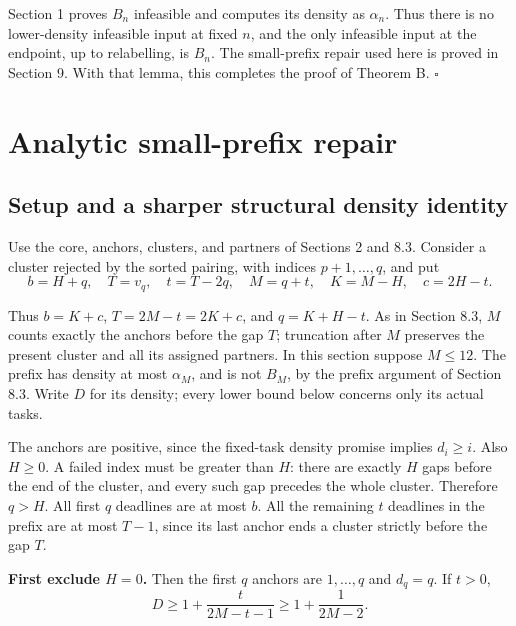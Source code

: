 \documentclass[11pt,a4paper]{article}
\begin{document}
Section 1 proves \(B_n\) infeasible and computes its density as \(\alpha_n\). Thus there is no lower-density infeasible input at fixed \(n\), and the only infeasible input at the endpoint, up to relabelling, is \(B_n\). The small-prefix repair used here is proved in Section 9. With that lemma, this completes the proof of Theorem B. \(\square\)

\hypertarget{analytic-small-prefix-repair}{%
\section{Analytic small-prefix repair}\label{analytic-small-prefix-repair}}

\hypertarget{setup-and-a-sharper-structural-density-identity}{%
\subsection{Setup and a sharper structural density identity}\label{setup-and-a-sharper-structural-density-identity}}

Use the core, anchors, clusters, and partners of Sections 2 and 8.3. Consider a cluster rejected by the sorted pairing, with indices \(p+1,\ldots,q\), and put
\begin{equation}
b=H+q,\quad T=v_q,\quad t=T-2q,\quad
 M=q+t,\quad K=M-H,\quad c=2H-t.
\tag{9.1}
\label{eq:9.1}
\end{equation}

Thus \(b=K+c\), \(T=2M-t=2K+c\), and \(q=K+H-t\). As in Section 8.3, \(M\) counts exactly the anchors before the gap \(T\); truncation after \(M\) preserves the present cluster and all its assigned partners. In this section suppose \(M\le 12\). The prefix has density at most \(\alpha_M\), and is not \(B_M\), by the prefix argument of Section 8.3. Write \(D\) for its density; every lower bound below concerns only its actual tasks.

The anchors are positive, since the fixed-task density promise implies \(d_i\ge i\). Also \(H\ge 0\). A failed index must be greater than \(H\): there are exactly \(H\) gaps before the end of the cluster, and every such gap precedes the whole cluster. Therefore \(q>H\). All first \(q\) deadlines are at most \(b\). All the remaining \(t\) deadlines in the prefix are at most \(T-1\), since its last anchor ends a cluster strictly before the gap \(T\).

\textbf{First exclude \(H=0\).} Then the first \(q\) anchors are \(1,\ldots,q\) and \(d_q=q\). If \(t>0\),
\[
 D\ge1+\frac{t}{2M-t-1}
 \ge1+\frac1{2M-2}.
\]
\end{document}

